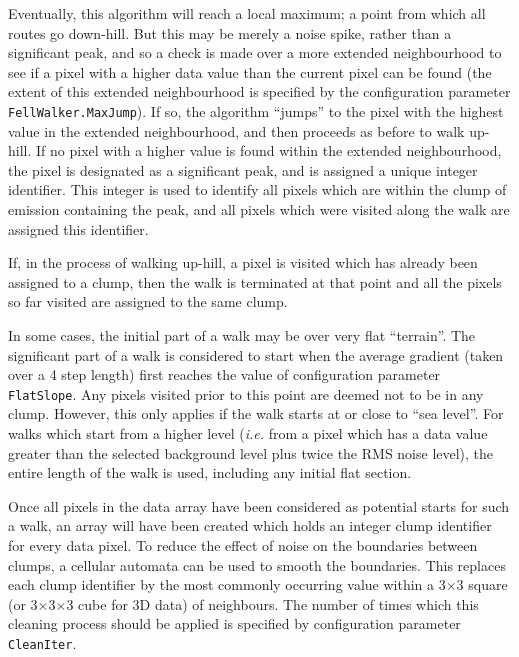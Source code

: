 \documentclass[twoside,11pt]{starlink}
\begin{document}
Eventually, this algorithm will reach a local maximum; a point from which
all routes go down-hill. But this may be merely a noise spike, rather
than a significant peak, and so a check is made over a more extended
neighbourhood to see if a pixel with a higher data value than the current
pixel can be found (the extent of this extended neighbourhood is
specified by the configuration parameter \texttt{FellWalker.MaxJump}). If so, the
algorithm ``jumps'' to the pixel with the highest value in the extended
neighbourhood, and then proceeds as before to walk up-hill. If no pixel
with a higher value is found within the extended neighbourhood, the pixel
is designated as a significant peak, and is assigned a unique integer
identifier. This integer is used to identify all pixels which are within
the clump of emission containing the peak, and all pixels which were
visited along the walk are assigned this identifier.

If, in the process of walking up-hill, a pixel is visited which has
already been assigned to a clump, then the walk is terminated at that
point and all the pixels so far visited are assigned to the same clump.

In some cases, the initial part of a walk may be over very flat
``terrain''. The significant part of a walk is considered to start when
the average gradient (taken over a 4 step length) first reaches the value
of configuration parameter \texttt{FlatSlope}. Any pixels visited prior to this point
are deemed not to be in any clump. However, this only applies if the
walk starts at or close to ``sea level''. For walks which start from a
higher level (\emph{i.e.} from a pixel which has a data value greater than
the selected background level plus twice the RMS noise level), the entire
length of the walk is used, including any initial flat section.

Once all pixels in the data array have been considered as potential
starts for such a walk, an array will have been created which holds an
integer clump identifier for every data pixel. To reduce the effect of
noise on the boundaries between clumps, a cellular automata can be used
to smooth the boundaries. This replaces each clump identifier by the most
commonly occurring value within a 3$\times$3 square (or 3$\times$3$\times$3
cube for 3D data)
of neighbours. The number of times which this cleaning process should be
applied is specified by configuration parameter \texttt{CleanIter}.
\end{document}
